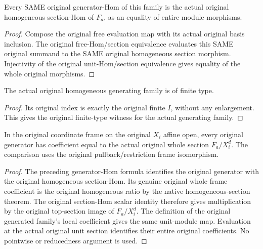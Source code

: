 \begin{lemma}
\label{lem:central-embedding-original-homogeneous-generators-actual-homs}
\leanok
Every SAME original generator-Hom of this family is the actual original
homogeneous section-Hom of $F_a$, as an equality of entire module morphisms.
\end{lemma}
\begin{proof}
Compose the original free evaluation map with its actual original basis inclusion.
The original free-Hom/section equivalence evaluates this SAME original summand to
the SAME original homogeneous section morphism. Injectivity of the original
unit-Hom/section equivalence gives equality of the whole original morphisms.
\end{proof}

\begin{lemma}
\label{lem:central-embedding-original-homogeneous-generators-finite}
\leanok
The actual original homogeneous generating family is of finite type.
\end{lemma}
\begin{proof}
Its original index is exactly the original finite $I$, without any enlargement.
This gives the original finite-type witness for the actual generating family.
\end{proof}

\begin{lemma}
\label{lem:central-embedding-original-homogeneous-generators-local-coefficient}
\leanok
In the original coordinate frame on the original $X_i$ affine open, every original
generator has coefficient equal to the actual original whole section $F_a/X_i^d$.
The comparison uses the original pullback/restriction frame isomorphism.
\end{lemma}
\begin{proof}
The preceding generator-Hom formula identifies the original generator with the
original homogeneous section-Hom. Its genuine original whole frame coefficient
is the original homogeneous ratio by the native homogeneous-section theorem.
The original section-Hom scalar identity therefore gives multiplication by the
original top-section image of $F_a/X_i^d$. The definition of the original generated
family's local coefficient gives the same unit-module map. Evaluation at the
actual original unit section identifies their entire original coefficients.
No pointwise or reducedness argument is used.
\end{proof}

